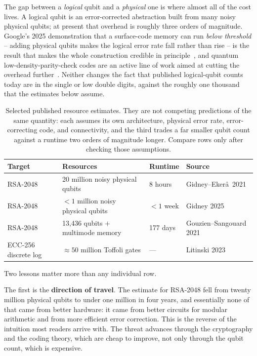 The gap between a \emph{logical} qubit and a \emph{physical} one is where almost
all of the cost lives. A logical qubit is an error-corrected abstraction built
from many noisy physical qubits; at present that overhead is roughly three
orders of magnitude. Google's 2025 demonstration that a surface-code memory can
run \emph{below threshold} -- adding physical qubits makes the logical error rate
fall rather than rise -- is the result that makes the whole construction credible
in principle~\cite{googleqec2025}, and quantum low-density-parity-check codes are
an active line of work aimed at cutting the overhead
further~\cite{bravyi2024}. Neither changes the fact that published logical-qubit
counts today are in the single or low double digits, against the roughly one
thousand that the estimates below assume.

\begin{table}[H]
\centering
\small
\begin{tabular}{@{}llll@{}}
\toprule
Target & Resources & Runtime & Source \\
\midrule
RSA-2048 & 20 million noisy physical qubits & 8 hours & Gidney--Eker\aa\ 2021~\cite{gidneyekera2021} \\
RSA-2048 & $<1$ million noisy physical qubits & $<1$ week & Gidney 2025~\cite{gidney2025qubits} \\
RSA-2048 & 13{,}436 qubits $+$ multimode memory & 177 days & Gouzien--Sangouard 2021~\cite{gouziensangouard2021} \\
ECC-256 discrete log & $\approx 50$ million Toffoli gates & --- & Litinski 2023~\cite{litinski2023} \\
\bottomrule
\end{tabular}
\caption{Selected published resource estimates. They are not competing
predictions of the same quantity: each assumes its own architecture, physical
error rate, error-correcting code, and connectivity, and the third trades a far
smaller qubit count against a runtime two orders of magnitude longer. Compare
rows only after checking those assumptions.}
\label{tab:resource-estimates}
\end{table}

Two lessons matter more than any individual row.

The first is the \textbf{direction of travel}. The estimate for RSA-2048 fell
from twenty million physical qubits to under one million in four years, and
essentially none of that came from better hardware: it came from better circuits
for modular arithmetic and from more efficient error correction. This is the
reverse of the intuition most readers arrive with. The threat advances through
the cryptography and the coding theory, which are cheap to improve, not only
through the qubit count, which is expensive.

